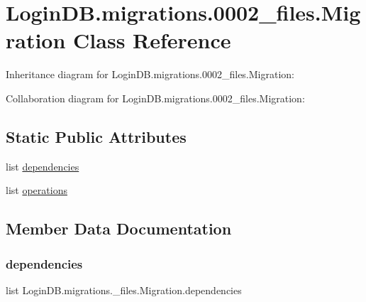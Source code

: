 \hypertarget{class_login_d_b_1_1migrations_1_10002__files_1_1_migration}{}\section{Login\+D\+B.\+migrations.0002\+\_\+files.Migration Class Reference}
\label{class_login_d_b_1_1migrations_1_10002__files_1_1_migration}


Inheritance diagram for Login\+D\+B.\+migrations.0002\+\_\+files.Migration\+:


Collaboration diagram for Login\+D\+B.\+migrations.0002\+\_\+files.Migration\+:
\subsection*{Static Public Attributes}
\begin{DoxyCompactItemize}
\item 
list \hyperlink{class_login_d_b_1_1migrations_1_10002__files_1_1_migration_ad27b508b4fe2f29abd6940ae6177711b}{dependencies}
\item 
list \hyperlink{class_login_d_b_1_1migrations_1_10002__files_1_1_migration_a09dc692658989e90ef82e3aafab0c427}{operations}
\end{DoxyCompactItemize}


\subsection{Member Data Documentation}
\mbox{\label{class_login_d_b_1_1migrations_1_10002__files_1_1_migration_ad27b508b4fe2f29abd6940ae6177711b}} 
\subsubsection{\texorpdfstring{dependencies}{dependencies}}
{\footnotesize\ttfamily list Login\+D\+B.\+migrations.\+\_\+files.\+Migration.\+dependencies\hspace{0.3cm}{\ttfamily [static]}}

